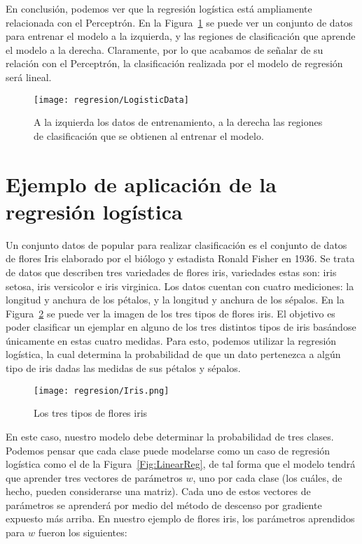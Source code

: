 En conclusión, podemos ver que la regresión logística está ampliamente relacionada con el Perceptrón. En la Figura~\ref{Fig:LogistData} se puede ver un conjunto de datos para entrenar el modelo a la izquierda, y las regiones de clasificación que aprende el modelo a la derecha. Claramente, por lo que acabamos de señalar de su relación con el Perceptrón, la clasificación realizada por el modelo de regresión será lineal.

\begin{figure}
 \centering
 \texttt{[image: regresion/LogisticData]}
 \caption{A la izquierda los datos de entrenamiento, a la derecha las regiones de clasificación que se obtienen al entrenar el modelo.}\label{Fig:LogistData}
\end{figure}


\section{Ejemplo de aplicación de la regresión logística}

Un conjunto datos de popular para realizar clasificación es el conjunto de datos de flores Iris elaborado por el biólogo y estadista Ronald Fisher en 1936. Se trata de datos que describen tres variedades de flores iris, variedades estas son: iris setosa, iris versicolor e iris virginica. Los datos cuentan con cuatro mediciones: la longitud y anchura de los pétalos, y la longitud y anchura de los sépalos. En la Figura~\ref{Fig:iris} se puede ver la imagen de los tres tipos de flores iris. El objetivo es poder clasificar un ejemplar en alguno de los tres distintos tipos de iris basándose únicamente en estas cuatro medidas. Para esto, podemos utilizar la regresión logística, la cual determina la probabilidad de que un dato pertenezca a algún tipo de iris dadas las medidas de sus pétalos y sépalos.


\begin{figure}
 \centering
 \texttt{[image: regresion/Iris.png]}
 \caption{Los tres tipos de flores iris}\label{Fig:iris}
\end{figure} 

En este caso, nuestro modelo debe determinar la probabilidad de tres clases. Podemos pensar que cada clase puede modelarse como un caso de regresión logística como el de la Figura~\ref{Fig:LinearReg}, de tal forma que el modelo tendrá que aprender tres vectores de parámetros $w$, uno por cada clase (los cuáles, de hecho, pueden considerarse una matriz). Cada uno de estos vectores de parámetros se aprenderá por medio del método de descenso por gradiente expuesto más arriba. En nuestro ejemplo de flores iris, los parámetros aprendidos para $w$ fueron los siguientes:


